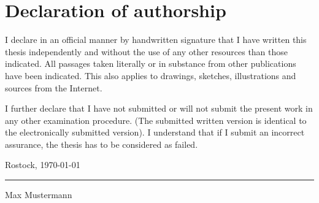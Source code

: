 \chapter*{Declaration of authorship} \label{chap:declareAuthorship}

\renewcommand{\arraystretch}{1.5}
I declare in an official manner by handwritten signature that I have written this thesis independently and without the use of any other resources than those indicated. All passages taken literally or in substance from other publications have been indicated. This also applies to drawings, sketches, illustrations and sources from the Internet. 

\vspace{5mm}

\noindent
I further declare that I have not submitted or will not submit the present work in any other examination procedure. (The submitted written version is identical to the electronically submitted version). I understand that if I submit an incorrect assurance, the thesis has to be considered as failed.



\vspace{5mm}
\noindent
Rostock, \today

\vspace{20mm}
\noindent
\rule{5cm}{0.5pt}
\newline
Max Mustermann